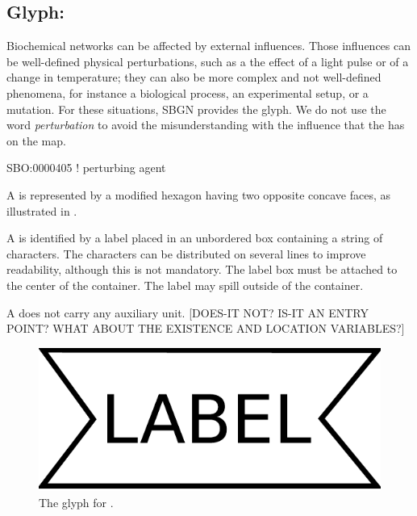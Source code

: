 \color{red}

\subsection{Glyph: }
\label{sec:perturbation}
 
Biochemical networks can be affected by external influences. Those
influences can be well-defined physical perturbations, such as a the effect of a light
pulse or of a change in temperature; they can also be more complex and not
well-defined phenomena, for instance a biological process, an experimental
setup, or a mutation.  For these situations, SBGN provides the
 glyph. We do not use the word \emph{perturbation} to avoid the misunderstanding with the influence that the  has on the map. 

\begin{glyphDescription}

\glyphSboTerm SBO:0000405 ! perturbing agent

\glyphContainer A  is represented by a modified hexagon
having two opposite concave faces, as illustrated in .

\glyphLabel A  is identified by a label placed in an
unbordered box containing a string of characters.  The characters can be
distributed on several lines to improve readability, although this is not
mandatory.  The label box must be attached to the center of the
 container.  The label may spill outside of the container.

\glyphAux A  does not carry any auxiliary unit. [DOES-IT NOT? IS-IT AN ENTRY POINT? WHAT ABOUT THE EXISTENCE AND LOCATION VARIABLES?]

\end{glyphDescription}

\begin{figure}[H]
  \centering
  \includegraphics[scale = 0.3]{images/perturbation}
  \caption{The \ER glyph for .}
  \label{fig:perturbation}
\end{figure}

